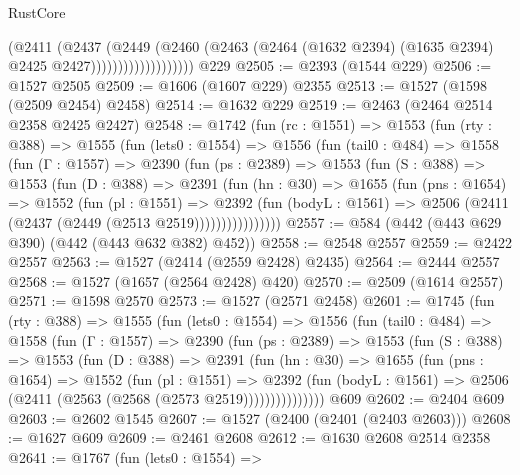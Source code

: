 \begin{lexlean}{RustCore}
\begin{coremodule}
                              (@2411
                                (@2437
                                  (@2449
                                    (@2460
                                      (@2463
                                        (@2464
                                          (@1632 @2394)
                                          (@1635 @2394)
                                          @2425
                                          @2427)))))))))))))))))))
    @229
@2505 := @2393 (@1544 @229)
@2506 := @1527 @2505
@2509 := @1606 (@1607 @229) @2355
@2513 := @1527 (@1598 (@2509 @2454) @2458)
@2514 := @1632 @229
@2519 := @2463 (@2464 @2514 @2358 @2425 @2427)
@2548 := @1742
    (fun (rc : @1551) =>
    @1553
      (fun (rty : @388) =>
      @1555
        (fun (lets0 : @1554) =>
        @1556
          (fun (tail0 : @484) =>
          @1558
            (fun (Γ : @1557) =>
            @2390
              (fun (ps : @2389) =>
              @1553
                (fun (S : @388) =>
                @1553
                  (fun (D : @388) =>
                  @2391
                    (fun (hn : @30) =>
                    @1655
                      (fun (pns : @1654) =>
                      @1552
                        (fun (pl : @1551) =>
                        @2392
                          (fun (bodyL : @1561) =>
                          @2506 (@2411 (@2437 (@2449 (@2513 @2519))))))))))))))))
@2557 := @584 (@442 (@443 @629 @390) (@442 (@443 @632 @382) @452))
@2558 := @2548 @2557
@2559 := @2422 @2557
@2563 := @1527 (@2414 (@2559 @2428) @2435)
@2564 := @2444 @2557
@2568 := @1527 (@1657 (@2564 @2428) @420)
@2570 := @2509 (@1614 @2557)
@2571 := @1598 @2570
@2573 := @1527 (@2571 @2458)
@2601 := @1745
    (fun (rty : @388) =>
    @1555
      (fun (lets0 : @1554) =>
      @1556
        (fun (tail0 : @484) =>
        @1558
          (fun (Γ : @1557) =>
          @2390
            (fun (ps : @2389) =>
            @1553
              (fun (S : @388) =>
              @1553
                (fun (D : @388) =>
                @2391
                  (fun (hn : @30) =>
                  @1655
                    (fun (pns : @1654) =>
                    @1552
                      (fun (pl : @1551) =>
                      @2392
                        (fun (bodyL : @1561) =>
                        @2506 (@2411 (@2563 (@2568 (@2573 @2519)))))))))))))))
    @609
@2602 := @2404 @609
@2603 := @2602 @1545
@2607 := @1527 (@2400 (@2401 (@2403 @2603)))
@2608 := @1627 @609
@2609 := @2461 @2608
@2612 := @1630 @2608 @2514 @2358
@2641 := @1767
    (fun (lets0 : @1554) =>

\end{coremodule}
\end{lexlean}
